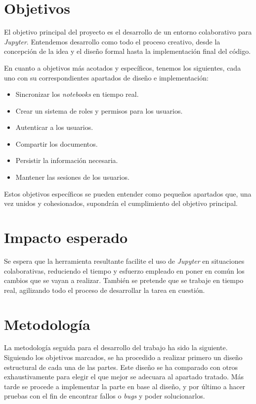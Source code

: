 \documentclass[11pt,spanish,listoffigures]{tfgetsinf}
\begin{document}

\section{Objetivos}
\label{sec:objetivos}

El objetivo principal del proyecto es el desarrollo de un entorno colaborativo para \textit{Jupyter}. Entendemos desarrollo como todo el proceso creativo, desde la concepción de la idea y el diseño formal hasta la implementación final del código.

En cuanto a objetivos más acotados y específicos, tenemos los siguientes, cada uno con su correspondientes apartados de diseño e implementación:
\begin{itemize}
\item Sincronizar los \textit{notebooks} en tiempo real.
\item Crear un sistema de roles y permisos para los usuarios.
\item Autenticar a los usuarios.
\item Compartir los documentos.
\item Persistir la información necesaria.
\item Mantener las sesiones de los usuarios.
\end{itemize}

Estos objetivos específicos se pueden entender como pequeños apartados que, una vez unidos y cohesionados, supondrán el cumplimiento del objetivo principal.



\section{Impacto esperado}
\label{sec:impacto}

Se espera que la herramienta resultante facilite el uso de \textit{Jupyter} en situaciones colaborativas, reduciendo el tiempo y esfuerzo empleado en poner en común los cambios que se vayan a realizar. También se pretende que se trabaje en tiempo real, agilizando todo el proceso de desarrollar la tarea en cuestión. 



\section{Metodología}
\label{sec:metodologia}

La metodología seguida para el desarrollo del trabajo ha sido la siguiente. Siguiendo los objetivos marcados, se ha procedido a realizar primero un diseño estructural de cada una de las partes. Este diseño se ha comparado con otros exhaustivamente para elegir el que mejor se adecuara al apartado tratado. Más tarde se procede a implementar la parte en base al diseño, y por último a hacer pruebas con el fin de encontrar fallos o \textit{\gls{bug}s} y poder solucionarlos.
\end{document}
